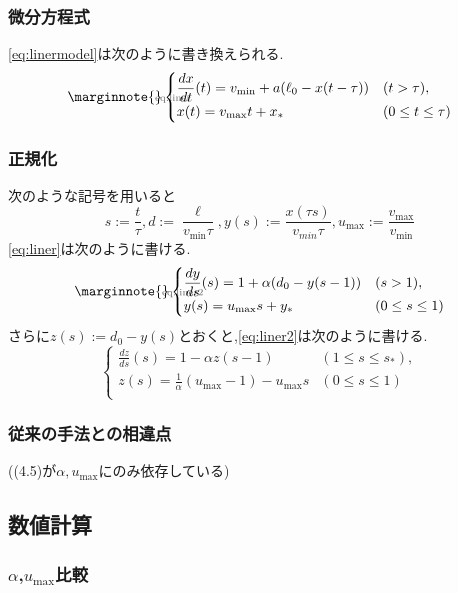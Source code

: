 \documentclass [dvipdfmx] {jsarticle}
\makeatletter
\let\temp@label\label
\def\label#1{\marginnote{\hbox to 0pt{\scriptsize \textcolor{black!60}{#1}\hss}}\temp@label{#1}\ignorespaces}
\numberwithin{equation}{section}
\theoremstyle{definition} %
\theoremstyle{definition} %
\makeatother
\begin{document}
\subsubsection{微分方程式}
\eqref{eq:linermodel}は次のように書き換えられる.
\begin{equation}\label{eq:liner}\begin{cases}
    \displaystyle\frac{dx}{dt}(t)=v_{\min}+a(\ell_0-x(t-\tau)) &(t>\tau),\\
    x(t)=v_{\max}t+x_\ast &(0\le t \le \tau)
\end{cases}\end{equation}
\subsubsection{正規化}
次のような記号を用いると
\begin{equation}
    s:=\displaystyle\frac{t}{\tau},d:=\frac{\ell}{v_{\min}\tau},
    y(s):=\displaystyle\frac{x(\tau s)}{v_{min}\tau},
    u_{\max}:=\displaystyle\frac{v_{\max}}{v_{\min}}
\end{equation}
\eqref{eq:liner}は次のように書ける.
\begin{equation}\label{eq:liner2}\begin{cases}
    \displaystyle\frac{dy}{ds}(s)=1+\alpha(d_0-y(s-1)) &(s>1),\\
    y(s)=u_{\max}s+y_\ast &(0\le s \le 1)
\end{cases}\end{equation}
さらに$z(s):=d_0-y(s)$とおくと,\eqref{eq:liner2}は次のように書ける.
\begin{equation}\begin{cases}
    \displaystyle\frac{dz}{ds}(s)=1-\alpha z(s-1) &(1\le s\le s_\ast),\\
    z(s)=\displaystyle\frac{1}{\alpha}(u_{\max}-1)-u_{\max}s &(0\le s\le 1)\\
\end{cases}\end{equation}
\subsubsection{従来の手法との相違点}
((4.5)が$\alpha,u_{\max}$にのみ依存している)
\subsection{数値計算}
\subsubsection{$\alpha$,$u_{\max}$比較}
\end{document}
